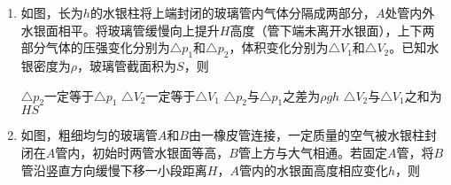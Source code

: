 \begin{enumerate}[leftmargin=0em]
\begin{enumerate}
\end{enumerate}
\begin{figure}[h!]
\flushright

\end{figure}




\newpage

\item
{}
如图，长为$ h $的水银柱将上端封闭的玻璃管内气体分隔成两部分，$ A $处管内外水银面相平。将玻璃管缓慢向上提升$ H $高度（管下端未离开水银面），上下两部分气体的压强变化分别为$ \triangle p_1 $和$ \triangle p_2 $，体积变化分别为$ \triangle V_1 $和$ \triangle V_2 $。已知水银密度为$ \rho $，玻璃管截面积为$ S $，则  

\begin{minipage}[h!]{0.7\linewidth}
\vspace{0.3em}
\fourchoices
{$ \triangle p_2 $一定等于$ \triangle p_1 $}
{$ \triangle V_2 $一定等于$ \triangle V_1 $}
{$ \triangle p_2 $与$ \triangle p_1 $之差为$ \rho gh $	}
{$ \triangle V_2 $与$ \triangle V_1 $之和为$ HS $}

\vspace{0.3em}
\end{minipage}
\hfill
\begin{minipage}[h!]{0.3\linewidth}
\flushright
\vspace{0.3em}

\vspace{0.3em}
\end{minipage}




\item 
{}
如图，粗细均匀的玻璃管$ A $和$ B $由一橡皮管连接，一定质量的空气被水银柱封闭在$ A $管内，初始时两管水银面等高，$ B $管上方与大气相通。若固定$ A $管，将$ B $管沿竖直方向缓慢下移一小段距离$ H $，$ A $管内的水银面高度相应变化$ h $，则  



\end{enumerate}
